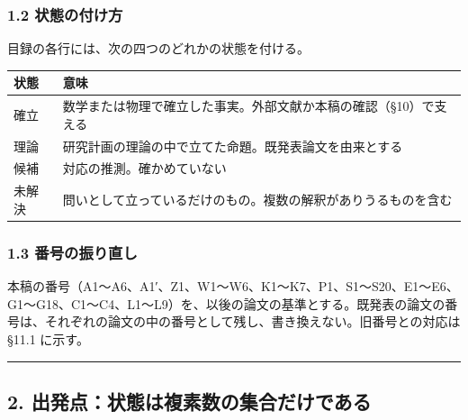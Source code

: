 \documentclass[
  a4paper,
]{ltjsarticle}
\newcounter{none} %
\begin{document}
\subsubsection{1.2
状態の付け方}\label{ux72b6ux614bux306eux4ed8ux3051ux65b9}

目録の各行には、次の四つのどれかの状態を付ける。

{\def\LTcaptype{none} %
\begin{longtable}[]{@{}
  >{\raggedright\arraybackslash}p{}
  >{\raggedright\arraybackslash}p{}@{}}
\toprule\noalign{}
\begin{minipage}[b]{\linewidth}\raggedright
状態
\end{minipage} & \begin{minipage}[b]{\linewidth}\raggedright
意味
\end{minipage} \\
\midrule\noalign{}
\endhead
\bottomrule\noalign{}
\endlastfoot
確立 &
数学または物理で確立した事実。外部文献か本稿の確認（§10）で支える \\
理論 & 研究計画の理論の中で立てた命題。既発表論文を由来とする \\
候補 & 対応の推測。確かめていない \\
未解決 &
問いとして立っているだけのもの。複数の解釈がありうるものを含む \\
\end{longtable}
}

\subsubsection{1.3
番号の振り直し}\label{ux756aux53f7ux306eux632fux308aux76f4ux3057}

本稿の番号（A1〜A6、A1′、Z1、W1〜W6、K1〜K7、P1、S1〜S20、E1〜E6、G1〜G18、C1〜C4、L1〜L9）を、以後の論文の基準とする。既発表の論文の番号は、それぞれの論文の中の番号として残し、書き換えない。旧番号との対応は
§11.1 に示す。

\begin{center}\rule{0.5\linewidth}{0.5pt}\end{center}

\subsection{2.
出発点：状態は複素数の集合だけである}\label{ux51faux767aux70b9ux72b6ux614bux306fux8907ux7d20ux6570ux306eux96c6ux5408ux3060ux3051ux3067ux3042ux308b}
\end{document}
